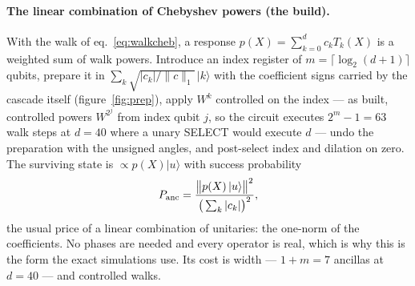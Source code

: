 \documentclass[11pt,a4paper]{article}
\begin{document}
\paragraph{The linear combination of Chebyshev powers (the build).} With
the walk of eq.~\eqref{eq:walkcheb}, a response $p(X)=\sum_{k=0}^{d}c_kT_k(X)$
is a weighted sum of walk powers. Introduce an index register of
$m=\lceil\log_2(d{+}1)\rceil$ qubits, prepare it in
$\sum_k\sqrt{|c_k|/\lVert c\rVert_1}\,|k\rangle$ with the coefficient signs
carried by the cascade itself (figure~\ref{fig:prep}), apply $W^{k}$
controlled on the index --- as built,
controlled powers $W^{2^{j}}$ from index qubit $j$, so the circuit executes
$2^{m}-1=63$ walk steps at $d=40$ where a unary SELECT would execute $d$ ---
undo the preparation with the unsigned angles, and post-select index and
dilation on zero. The
surviving state is $\propto p(X)|u\rangle$ with success probability
\begin{equation}
P_{\rm anc}=\frac{\big\lVert p(X)\,|u\rangle\big\rVert^{2}}
{\big(\sum_k |c_k|\big)^{2}} ,
\label{eq:psucc}
\end{equation}
the usual price of a linear combination of unitaries: the one-norm of the
coefficients. No phases are needed and every operator is real, which is
why this is the form the exact simulations use. Its cost is width ---
$1+m=7$ ancillas at $d=40$ --- and controlled walks.
\end{document}
